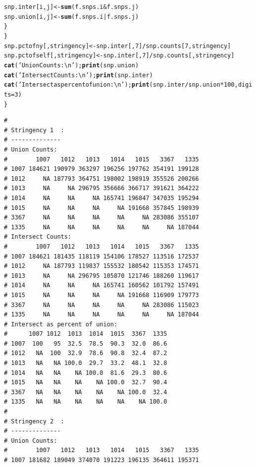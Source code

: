 \documentclass{article}\usepackage[]{graphicx}\usepackage[]{color}
\makeatletter
\newcommand{\hlnum}[1]{\textcolor[rgb]{0.686,0.059,0.569}{#1}}%
\newcommand{\hlstr}[1]{\textcolor[rgb]{0.192,0.494,0.8}{#1}}%
\newcommand{\hlopt}[1]{\textcolor[rgb]{0,0,0}{#1}}%
\newcommand{\hlstd}[1]{\textcolor[rgb]{0.345,0.345,0.345}{#1}}%
\newcommand{\hlkwb}[1]{\textcolor[rgb]{0.69,0.353,0.396}{#1}}%
\newcommand{\hlkwc}[1]{\textcolor[rgb]{0.333,0.667,0.333}{#1}}%
\newcommand{\hlkwd}[1]{\textcolor[rgb]{0.737,0.353,0.396}{\textbf{#1}}}%
\newenvironment{kframe}{%
 \def\at@end@of@kframe{}%
 \ifinner\ifhmode%
  \def\at@end@of@kframe{\end{minipage}}%
  \begin{minipage}{\columnwidth}%
 \fi\fi%
 \def\FrameCommand##1{\hskip\@totalleftmargin \hskip-\fboxsep
 \colorbox{shadecolor}{##1}\hskip-\fboxsep
     \hskip-\linewidth \hskip-\@totalleftmargin \hskip\columnwidth}%
 \MakeFramed {\advance\hsize-\width
   \@totalleftmargin\z@ \linewidth\hsize
   \@setminipage}}%
 {\par\unskip\endMakeFramed%
 \at@end@of@kframe}
\newenvironment{knitrout}{}{} %
\makeatother
\begin{document}
\begin{knitrout}
\begin{kframe}
\begin{alltt}
      \hlstd{snp.inter[i,j]} \hlkwb{<-} \hlkwd{sum}\hlstd{(f.snps.i} \hlopt{&} \hlstd{f.snps.j)}
      \hlstd{snp.union[i,j]} \hlkwb{<-} \hlkwd{sum}\hlstd{(f.snps.i} \hlopt{|} \hlstd{f.snps.j)}
    \hlstd{\}}
  \hlstd{\}}
  \hlstd{snp.pctofny  [,stringency]} \hlkwb{<-} \hlstd{snp.inter[,}\hlnum{7}\hlstd{]}\hlopt{/}\hlstd{snp.counts[}\hlnum{7}\hlstd{,stringency]}
  \hlstd{snp.pctofself[,stringency]} \hlkwb{<-} \hlstd{snp.inter[,}\hlnum{7}\hlstd{]}\hlopt{/}\hlstd{snp.counts[ ,stringency]}
  \hlkwd{cat}\hlstd{(}\hlstr{'Union Counts:\textbackslash{}n'}\hlstd{);}                  \hlkwd{print}\hlstd{(snp.union)}
  \hlkwd{cat}\hlstd{(}\hlstr{'Intersect Counts:\textbackslash{}n'}\hlstd{);}              \hlkwd{print}\hlstd{(snp.inter)}
  \hlkwd{cat}\hlstd{(}\hlstr{'Intersect as percent of union:\textbackslash{}n'}\hlstd{);} \hlkwd{print}\hlstd{(snp.inter}\hlopt{/}\hlstd{snp.union}\hlopt{*}\hlnum{100}\hlstd{,}\hlkwc{digits}\hlstd{=}\hlnum{3}\hlstd{)}
\hlstd{\}}
\end{alltt}
\begin{verbatim}
# 
# Stringency 1  :
# --------------
# Union Counts:
#        1007   1012   1013   1014   1015   3367   1335
# 1007 184621 190979 363297 196256 197762 354191 199128
# 1012     NA 187793 364751 198002 198919 355526 200266
# 1013     NA     NA 296795 356666 366717 391621 364222
# 1014     NA     NA     NA 165741 196847 347035 195294
# 1015     NA     NA     NA     NA 191668 357845 198939
# 3367     NA     NA     NA     NA     NA 283086 355107
# 1335     NA     NA     NA     NA     NA     NA 187044
# Intersect Counts:
#        1007   1012   1013   1014   1015   3367   1335
# 1007 184621 181435 118119 154106 178527 113516 172537
# 1012     NA 187793 119837 155532 180542 115353 174571
# 1013     NA     NA 296795 105870 121746 188260 119617
# 1014     NA     NA     NA 165741 160562 101792 157491
# 1015     NA     NA     NA     NA 191668 116909 179773
# 3367     NA     NA     NA     NA     NA 283086 115023
# 1335     NA     NA     NA     NA     NA     NA 187044
# Intersect as percent of union:
#      1007 1012  1013  1014  1015  3367  1335
# 1007  100   95  32.5  78.5  90.3  32.0  86.6
# 1012   NA  100  32.9  78.6  90.8  32.4  87.2
# 1013   NA   NA 100.0  29.7  33.2  48.1  32.8
# 1014   NA   NA    NA 100.0  81.6  29.3  80.6
# 1015   NA   NA    NA    NA 100.0  32.7  90.4
# 3367   NA   NA    NA    NA    NA 100.0  32.4
# 1335   NA   NA    NA    NA    NA    NA 100.0
# 
# Stringency 2  :
# --------------
# Union Counts:
#        1007   1012   1013   1014   1015   3367   1335
# 1007 181682 189049 374070 191223 196135 364611 195371

\end{verbatim}
\end{kframe}
\end{knitrout}
\end{document}
